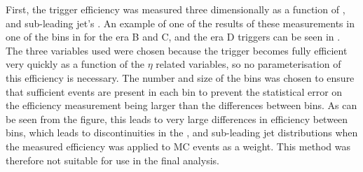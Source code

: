 First, the trigger efficiency was measured three dimensionally as a function of \METnoMU, \Mjj and sub-leading jet's \pt. An example of one of the results of these measurements in one of the bins in \METnoMU for the era B and C, and the era D triggers can be seen in . The three variables used were chosen because the trigger becomes fully efficient very quickly as a function of the $\eta$ related variables, so no parameterisation of this efficiency is necessary. The number and size of the bins was chosen to ensure that sufficient events are present in each bin to prevent the statistical error on the efficiency measurement being larger than the differences between bins. As can be seen from the figure, this leads to very large differences in efficiency between bins, which leads to discontinuities in the \METnoMU, \Mjj and sub-leading jet \pt distributions when the measured efficiency was applied to \ac{MC} events as a weight. This method was therefore not suitable for use in the final analysis.
